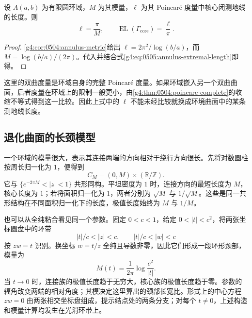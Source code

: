 \begin{proposition}
	\label{g4:prop:0505:modulus-core-length}
	设 \(A(a,b)\) 为有限圆环域，\(M\) 为其模量，\(\ell\) 为其 Poincaré 度量中核心闭测地线的长度。则
	\[
		\ell=\frac\pi M,\qquad
		\operatorname{EL}(\Gamma_{\mathrm{core}})=\frac\ell\pi.
	\]
\end{proposition}
\begin{proof}
	\cref{g4:cor:0504:annulus-metric}给出 \(\ell=2\pi^2/\log(b/a)\)，而 \(M=\log(b/a)/(2\pi)\)。代入并结合式\eqref{g4:eq:0505:annulus-extremal-length}即得。
\end{proof}

这里的双曲度量是环域自身的完整 Poincaré 度量。如果环域嵌入另一个双曲曲面，后者度量在环域上的限制一般更小，由\cref{g4:thm:0504:poincare-complete}的收缩不等式得到这一比较。因此上式中的 \(\ell\) 不能未经比较就换成环境曲面中的某条测地线长度。

\subsection{退化曲面的长颈模型}
\label{g4:subsec:0505:04}

一个环域的模量很大，表示其连接两端的方向相对于绕行方向很长。先将对数圆柱按周长归一化为 \(1\)，便得到
\[
	C_M=(0,M)\times(\mathbb R/\mathbb Z).
\]
它与 \(\{e^{-2\pi M}<|z|<1\}\) 共形同构。平坦密度为 \(1\) 时，连接方向的最短长度为 \(M\)，核心长度为 \(1\)；若将面积归一化为 \(1\)，两者分别为 \(\sqrt M\) 与 \(1/\sqrt M\)。这些是同一共形结构在不同面积归一化下的长度，极值长度始终为 \(M\) 与 \(1/M\)。

\ProseParagraphBreak

也可以从全纯粘合看见同一个参数。固定 \(0<c<1\)，给定 \(0<|t|<c^2\)，将两张坐标圆盘中的环带
\[
	|t|/c<|z|<c,\qquad |t|/c<|w|<c
\]
按 \(zw=t\) 识别。换坐标 \(w=t/z\) 全纯且导数非零，因此它们形成一段环形颈部，模量为
\begin{equation}
	\label{g4:eq:0505:plumbing-modulus}
	M(t)=\frac1{2\pi}\log\frac{c^2}{|t|}.
\end{equation}
当 \(t\to0\) 时，连接族的极值长度趋于无穷大，核心族的极值长度趋于零。参数的辐角改变两端的相对角度；其模决定这里算出的颈部长宽比。形式上的中心方程 \(zw=0\) 由两张相交坐标盘组成，提示结点处的两条分支；对每个 \(t\ne0\)，上述构造和模量计算均发生在光滑环带上。

